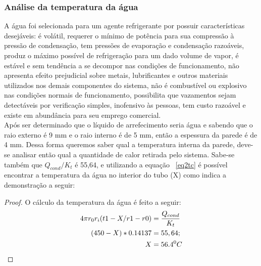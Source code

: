 \subsubsection{Análise da temperatura da água}
A água foi selecionada para um agente refrigerante por possuir características desejáveis: é volátil, requerer o mínimo de potência para sua compressão à pressão de condensação, tem pressões de evaporação e condensação razoáveis, produz o máximo possível de refrigeração para um dado volume de vapor, é estável e sem tendência a se decompor nas condições de funcionamento, não apresenta efeito prejudicial sobre metais, lubrificantes e outros materiais utilizados nos demais componentes do sistema, não é combustível ou explosivo nas condições normais de funcionamento, possibilita que vazamentos sejam detectáveis por verificação simples, inofensivo às pessoas,  tem custo razoável e existe em abundância para seu emprego comercial.\\
Após ser determinado que o líquido de arrefecimento seria água e sabendo que o raio externo é 9 mm e o raio interno é de 5 mm, então a espessura da parede é de 4 mm. Dessa forma queremos saber qual a temperatura interna da parede, deve-se analisar então qual a quantidade de calor  retirada pelo sistema. Sabe-se também que $Q_{cond}/K_t$ é 55,64, e utilizando a equação ~\ref{eq2tc} é possível encontrar a temperatura da água no interior do tubo (X) como indica a demonstração a seguir:
\begin{proof} O cálculo da temperatura da água é feito a seguir: 
	\begin{equation}\label{eqAtc}
	\begin{split}
	4\pi r_0r_i(t1-X/r1-r0)&=\frac{Q_{cond}}{K_t}\\
	(450 - X) * 0.14137&=55,64;\\
	X &= 56.4^0C \qedhere
	\end{split}	
	\end{equation}
\end{proof}

